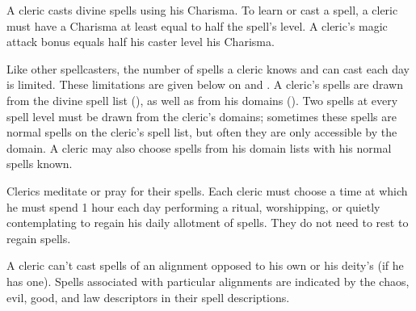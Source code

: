  A cleric casts divine spells using his Charisma. To learn or cast a spell, a cleric must have a Charisma at least equal to half the spell's level. A cleric's magic attack bonus equals half his caster level \add his Charisma.

Like other spellcasters, the number of spells a cleric knows and can cast each day is limited. These limitations are given below on  and . A cleric's spells are drawn from the divine spell list (), as well as from his domains (). Two spells at every spell level must be drawn from the cleric's domains; sometimes these spells are normal spells on the cleric's spell list, but often they are only accessible by the domain. A cleric may also choose spells from his domain lists with his normal spells known.

Clerics meditate or pray for their spells. Each cleric must choose a time at which he must spend 1 hour each day performing a ritual, worshipping, or quietly contemplating to regain his daily allotment of spells. They do not need to rest to regain spells.

A cleric can't cast spells of an alignment opposed to his own or his deity's (if he has one). Spells associated with particular alignments are indicated by the chaos, evil, good, and law descriptors in their spell descriptions.

